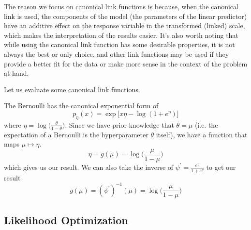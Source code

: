     The reason we focus on canonical link functions is because, when the canonical link is used, the components of the model (the parameters of the linear predictor) have an additive effect on the response variable in the transformed (linked) scale, which makes the interpretation of the results easier. It's also worth noting that while using the canonical link function has some desirable properties, it is not always the best or only choice, and other link functions may be used if they provide a better fit for the data or make more sense in the context of the problem at hand.

    Let us evaluate some canonical link functions. 

    \begin{example}
      \label{ex:the-bernoulli-in-canonical-form}
    The Bernoulli has the canonical exponential form of 
    \begin{equation}
      p_\eta (x) = \exp \big[ x \eta - \log (1 + e^\eta) \big]
    \end{equation}
    where $\eta = \log \big( \frac{\theta}{1 - \theta} \big)$. Since we have prior knowledge that $\theta = \mu$ (i.e. the expectation of a Bernoulli is the hyperparameter $\theta$ itself), we have a function that maps $\mu \mapsto \eta$. 
    \begin{equation}
      \eta = g(\mu) = \log \bigg( \frac{\mu}{1 - \mu} \bigg)
    \end{equation}
    which gives us our result. We can also take the inverse of $\psi^\prime = \frac{e^\eta}{1 + e^\eta}$ to get our result 
    \begin{equation}
      g (\mu) = (\psi^\prime)^{-1} (\mu) = \log \bigg( \frac{\mu}{1 - \mu} \bigg)
    \end{equation}
    \end{example}

\subsection{Likelihood Optimization}

